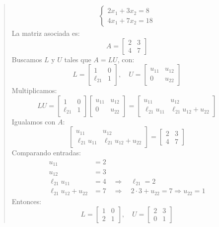 \begin{quote}

  \begin{align*}
  \begin{cases}
  2x_1 + 3x_2 = 8 \\
  4x_1 + 7x_2 = 18
  \end{cases}
  \end{align*}
  La matriz asociada es:
  \[
  A = \begin{bmatrix}
  2 & 3 \\
  4 & 7
  \end{bmatrix}
  \]
  Buscamos \(L\) y \(U\) tales que \(A = LU\), con:
  \[
  L = \begin{bmatrix}
  1 & 0 \\
  \ell_{21} & 1
  \end{bmatrix}, \quad
  U = \begin{bmatrix}
  u_{11} & u_{12} \\
  0 & u_{22}
  \end{bmatrix}
  \]
  Multiplicamos:
  \[
  LU = \begin{bmatrix}
  1 & 0 \\
  \ell_{21} & 1
  \end{bmatrix}
  \begin{bmatrix}
  u_{11} & u_{12} \\
  0 & u_{22}
  \end{bmatrix}
  = \begin{bmatrix}
  u_{11} & u_{12} \\
  \ell_{21} u_{11} & \ell_{21} u_{12} + u_{22}
  \end{bmatrix}
  \]
  Igualamos con \(A\):
  \[
  \begin{bmatrix}
  u_{11} & u_{12} \\
  \ell_{21} u_{11} & \ell_{21} u_{12} + u_{22}
  \end{bmatrix}
  =
  \begin{bmatrix}
  2 & 3 \\
  4 & 7
  \end{bmatrix}
  \]
  Comparando entradas:
  \begin{align*}
  u_{11} &= 2 \\
  u_{12} &= 3 \\
  \ell_{21} u_{11} &= 4 \quad \Rightarrow \quad \ell_{21} = 2 \\
  \ell_{21} u_{12} + u_{22} &= 7 \quad \Rightarrow \quad 2\cdot 3 + u_{22} = 7 \Rightarrow u_{22} = 1
  \end{align*}
  Entonces:
  \[
  L = \begin{bmatrix}
  1 & 0 \\
  2 & 1
  \end{bmatrix}, \quad
  U = \begin{bmatrix}
  2 & 3 \\
  0 & 1
  \end{bmatrix}
  \]


\end{quote}
